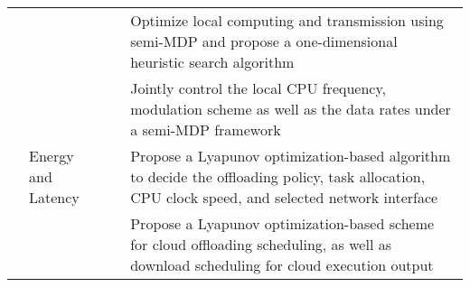 \documentclass[journal]{IEEEtran}
\begin{document}
{{\begin{table*}
{\begin{tabular}{ | p{2.3cm}|  p{2.8cm}|  p{1.3cm}|  p{8cm}|}
  &   & \cite{SChenGLOBECOM1312} & Optimize local computing and transmission using semi-MDP and propose a one-dimensional heuristic search algorithm \\ \cline{2-4}
 & \multirow{8}{*}{Energy and Latency}  & \cite{hong2016qoe} & Jointly control the local CPU frequency, modulation scheme as well as the data rates under a semi-MDP framework \\ \cline{3-4} %
   &    & \cite{KwakJSAC1512}  & Propose  a Lyapunov optimization-based algorithm  to  decide the offloading policy, task allocation, CPU clock speed, and selected network interface \\ \cline{3-4}
  &   & \cite{ZJiangAccess1511} & Propose a Lyapunov optimization-based scheme for cloud offloading scheduling, as well as download scheduling for cloud execution output \\ \cline{2-4}
 \hline
 \end{tabular}}
 \end{table*}






}}
\end{document}
